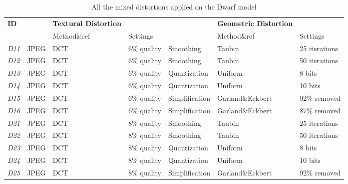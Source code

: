 \begin{table}[]
\centering
\caption{All the mixed distortions applied on the Dwarf model}
\label{my-label}
\begin{tabular}{lllllll}
\textbf{ID}  & \textbf{}    & \textbf{Textural Distortion} & \textbf{}    & \textbf{}      & \textbf{Geometric Distortion} &                \\
             &              & Method\&ref                  & Settings     &                & Method\&ref                   & Settings       \\
\textit{D11} & JPEG         & DCT                          & 6\% quality  & Smoothing      & Taubin                        & 25  iterations \\
\textit{D12} & JPEG         & DCT                          & 6\% quality  & Smoothing      & Taubin                        & 50 iterations  \\
\textit{D13} & JPEG         & DCT                          & 6\% quality  & Quantization   & Uniform                       & 8 bits         \\
\textit{D14} & JPEG         & DCT                          & 6\% quality  & Quantization   & Uniform                       & 10 bits        \\
\textit{D15} & JPEG         & DCT                          & 6\% quality  & Simplification & Garland\&Eckbert \cite{Garland_1997}            & 92\% removed   \\
\textit{D16} & JPEG         & DCT                          & 6\% quality  & Simplification & Garland\&Eckbert \cite{Garland_1997}             & 87\% removed   \\
\textit{D21} & JPEG         & DCT                          & 8\% quality  & Smoothing      & Taubin                        & 25  iterations \\
\textit{D22} & JPEG         & DCT                          & 8\% quality  & Smoothing      & Taubin                        & 50 iterations  \\
\textit{D23} & JPEG         & DCT                          & 8\% quality  & Quantization   & Uniform                       & 8 bits         \\
\textit{D24} & JPEG         & DCT                          & 8\% quality  & Quantization   & Uniform                       & 10 bits        \\
\textit{D25} & JPEG         & DCT                          & 8\% quality  & Simplification & Garland\&Eckbert  \cite{Garland_1997}            & 92\% removed   \\

\end{tabular}
\end{table}
